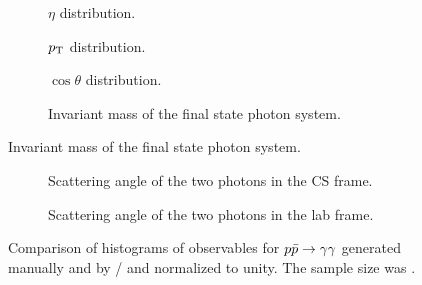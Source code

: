 \begin{figure}[hp]
  \centering
  \begin{subfigure}{.49\textwidth}
    \centering {}
    \caption{\label{fig:pdf-eta} \(\eta\) distribution.}
  \end{subfigure}
  \begin{subfigure}{.49\textwidth}
    \centering {}
    \caption{\label{fig:pdf-pt} \(p_\mathrm{T}\) distribution.}
  \end{subfigure}
  \begin{subfigure}{.49\textwidth}
    \centering {}
    \caption{\label{fig:pdf-cos-theta} \(\cos\theta\) distribution.}
  \end{subfigure}
  \begin{subfigure}{.49\textwidth}
    \centering {}
    \caption[Histogram of the invariant mass of the final state photon
    system.]{\label{fig:pdf-inv-m} Invariant mass of the
      final state photon system. %
    }
  \end{subfigure}
\end{figure}
%
\begin{figure}
  \ContinuedFloat
  \begin{subfigure}{.49\textwidth}
    \centering {}
    \caption{\label{fig:pdf-o-angle-cs} Scattering angle of the two
      photons in the CS frame.}
  \end{subfigure}
  \begin{subfigure}{.49\textwidth}
    \centering {}
    \caption{\label{fig:pdf-o-angle} Scattering angle of the two
      photons in the lab frame.}
  \end{subfigure}
  \caption{\label{fig:pdf-histos}Comparison of histograms of
    observables for \(p\bar{p}\rightarrow\gamma\gamma\) generated manually and by \sherpa/\rivet
    and normalized to unity. The sample size was \protect
    . }
\end{figure}
%
